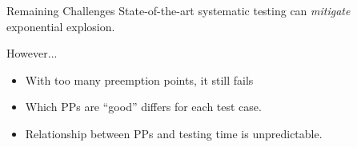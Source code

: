 \documentclass[xcolor=dvipsnames]{beamer}
\begin{document}
%

\begin{frame}{Remaining Challenges}
	State-of-the-art systematic testing can {\em mitigate} exponential explosion.
	\linegap

	However...
	\begin{itemize}
		\item With too many preemption points, it still fails
		\item Which PPs are ``good'' differs for each test case.
		\item Relationship between PPs and testing time is unpredictable.
	\end{itemize}

\end{frame}

\end{document}
